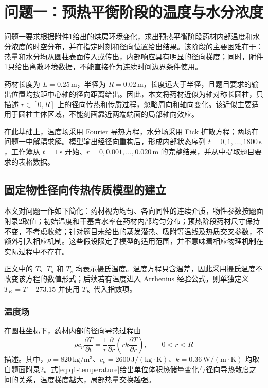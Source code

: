 \section{问题一：预热平衡阶段的温度与水分浓度}

问题一要求根据附件1给出的烘房环境变化，求出预热平衡阶段药材内部温度和水分浓度的时空分布，并在指定时刻和径向位置给出结果。该阶段的主要困难在于：热量和水分均从圆柱表面传入或传出，内部响应具有明显的径向梯度；同时，附件1只给出离散环境数据，不能直接作为连续时间边界条件使用。

药材长度为 $L=0.25\,\mathrm{m}$，半径为 $R=0.02\,\mathrm{m}$，长度远大于半径，且题目要求的输出位置均按距中心轴的径向距离给出。因此，本文将药材近似为轴对称长圆柱，只描述 $r\in[0,R]$ 上的径向传热和传质过程，忽略周向和轴向变化。该近似主要适用于圆柱主体区域，不能刻画靠近两端端面的局部轴向效应。

在此基础上，温度场采用 Fourier 导热方程，水分场采用 Fick 扩散方程\cite{yang2006}；两场在问题一中解耦求解。模型输出经径向重构后，形成内部状态序列 $t=0,1,\ldots,1800\,\mathrm{s}$，工作簿从 $t=1\,\mathrm{s}$ 开始、$r=0,0.001,\ldots,0.020\,\mathrm{m}$ 的完整结果，并从中提取题目要求的表格数据。

\subsection{固定物性径向传热传质模型的建立}

本文对问题一作如下简化：药材视为均匀、各向同性的连续介质，物性参数按题面附录2取值；初始温度和干基含水率在药材内部均匀分布；预热阶段药材尺寸保持不变，不考虑收缩；针对题目未给出的蒸发潜热、吸附等温线及热质交叉参数，不额外引入相应机制。这些假设限定了模型的适用范围，并不意味着相应物理机制在实际过程中不存在。

正文中的 $T$、$T_a$ 和 $T_s$ 均表示摄氏温度。温度方程只含温差，因此采用摄氏温度不改变该方程的数值形式；后续若有温度进入 Arrhenius 经验公式，则单独定义 $T_K=T+273.15$ 并使用 $T_K$ 代入指数项。

\subsubsection{温度场}

在圆柱坐标下，药材内部的径向导热过程由
\begin{equation}
\rho c_p\frac{\partial T}{\partial t}
=\frac{1}{r}\frac{\partial}{\partial r}
\left(rk\frac{\partial T}{\partial r}\right),
\qquad 0<r<R
\label{eq:q1-temperature}
\end{equation}
描述。其中，$\rho=820\,\mathrm{kg/m^3}$、$c_p=2600\,\mathrm{J/(kg\cdot K)}$、$k=0.36\,\mathrm{W/(m\cdot K)}$ 均取自题面附录2。式\eqref{eq:q1-temperature}给出单位体积热储量变化与径向导热散度之间的关系，温度梯度越大，局部热量交换越强。


